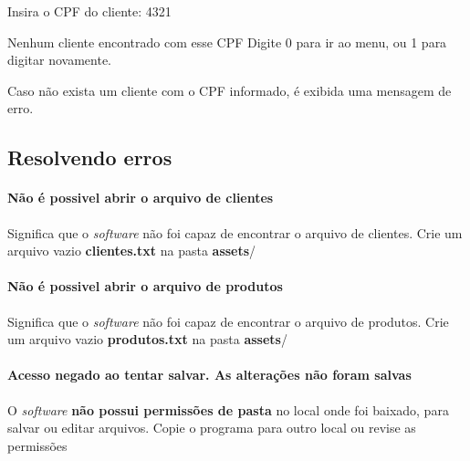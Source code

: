 \begin{DoxyVerb}

Insira o CPF do cliente: 4321

Nenhum cliente encontrado com esse CPF
Digite 0 para ir ao menu, ou 1 para digitar novamente.
\end{DoxyVerb}



\begin{DoxyItemize}
\item Caso não exista um cliente com o C\+PF informado, é exibida uma mensagem de erro. ~\newline

\end{DoxyItemize}

\subsection*{Resolvendo erros}

\paragraph*{Não é possivel abrir o arquivo de clientes}


\begin{DoxyItemize}
\item Significa que o {\itshape software} não foi capaz de encontrar o arquivo de clientes. Crie um arquivo vazio {\bfseries clientes.\+txt} na pasta {\bfseries assets}/
\end{DoxyItemize}

\paragraph*{Não é possivel abrir o arquivo de produtos}


\begin{DoxyItemize}
\item Significa que o {\itshape software} não foi capaz de encontrar o arquivo de produtos. Crie um arquivo vazio {\bfseries produtos.\+txt} na pasta {\bfseries assets}/
\end{DoxyItemize}

\paragraph*{Acesso negado ao tentar salvar. As alterações não foram salvas}


\begin{DoxyItemize}
\item O {\itshape software} {\bfseries não possui permissões de pasta} no local onde foi baixado, para salvar ou editar arquivos. Copie o programa para outro local ou revise as permissões
\end{DoxyItemize}

